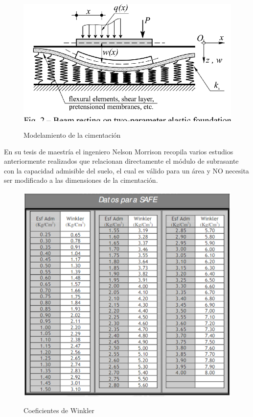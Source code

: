\documentclass{article}%
\begin{document}
\begin{figure}[h!]
    \centering
    \caption{Modelamiento de la cimentación}
    \includegraphics[trim={0 0.5cm 0 0},clip,scale=0.6]{../idealizacion_cim.png}
    \label{atrans}
\end{figure} 
\newpage
En su tesis de maestría el ingeniero Nelson Morrison recopila varios estudios anteriormente realizados que relacionan directamente el módulo de subrasante con la capacidad admisible del suelo, el cual es válido para un área y NO necesita ser modificado a las dimensiones de la cimentación.

\begin{figure}[h!]
    \centering
    \caption{Coeficientes de Winkler}
    \includegraphics[scale=1]{../tabla_winkler.PNG}
    \label{atrans}
\end{figure} 
\end{document}
